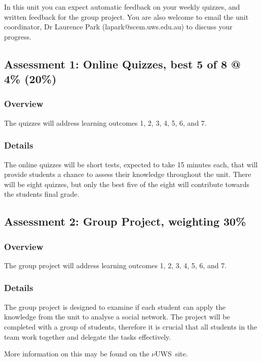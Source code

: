 \documentclass{uws_learning_guide}
\newcommand{\vuws}{$\nu$UWS}
\begin{document}
In this unit you can expect automatic feedback on your weekly quizzes,
and written feedback for the group project.
You are also
welcome to email the unit coordinator, Dr Laurence Park
(lapark@scem.uws.edu.au) to discuss your progress.

\subsection{Assessment 1: Online Quizzes, best 5 of 8 @ 4\% (20\%)}

\subsubsection{Overview}

The quizzes will address learning outcomes 1, 2, 3, 4, 5, 6, and 7.

\subsubsection{Details}

The online quizzes will be short tests, expected to take 15 minutes
each, that will provide students a chance to assess their knowledge
throughout the unit.  There will be eight quizzes, but only the best
five of the eight will contribute towards the students final grade.


\subsection{Assessment 2: Group Project, weighting 30\%}

\subsubsection{Overview}

The group project will address learning outcomes 1, 2, 3, 4, 5, 6, and 7.

\subsubsection{Details}

The group project is designed to examine if each student can apply the
knowledge from the unit to analyse a social network.  The project
will be completed with a group of students, therefore it is crucial
that all students in the team work together and delegate the tasks
effectively.

More information on this may be found on the \vuws~site.
\end{document}
